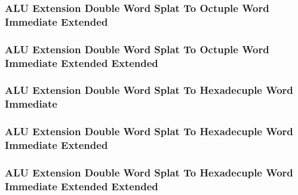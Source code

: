 \subsubsection[{\small ALU Extension Double Word Splat To Octuple Word Immediate Extended}]{ALU Extension Double Word Splat To Octuple Word Immediate Extended} \label{sec:format-ALU-XSDOI.X}



\subsubsection[{\small ALU Extension Double Word Splat To Octuple Word Immediate Extended Extended}]{ALU Extension Double Word Splat To Octuple Word Immediate Extended Extended} \label{sec:format-ALU-XSDOI.Y}



\subsubsection[{\small ALU Extension Double Word Splat To Hexadecuple Word Immediate}]{ALU Extension Double Word Splat To Hexadecuple Word Immediate} \label{sec:format-ALU-XSDXI}



\subsubsection[{\small ALU Extension Double Word Splat To Hexadecuple Word Immediate Extended}]{ALU Extension Double Word Splat To Hexadecuple Word Immediate Extended} \label{sec:format-ALU-XSDXI.X}



\subsubsection[{\small ALU Extension Double Word Splat To Hexadecuple Word Immediate Extended Extended}]{ALU Extension Double Word Splat To Hexadecuple Word Immediate Extended Extended} \label{sec:format-ALU-XSDXI.Y}

